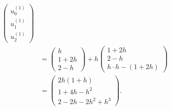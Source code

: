 \documentclass[12pt]{article}
\begin{document}
\begin{enumerate}[i)]
\begin{align}
{\begin{aligned}
\begin{pmatrix}
					      u_0^{(1)} \\u_1^{(1)} \\u_2^{(1)}
				      \end{pmatrix}
				      \\
				                & =
				      \begin{pmatrix}
					      h \\1+2h\\2-h
				      \end{pmatrix}
				      +h\begin{pmatrix}
					      1+2h \\2-h\\h\cdot h-(1+2h)
				      \end{pmatrix}             \\
				                & 
				      =\begin{pmatrix}
					      2h(1+h) \\1+4h-h^2\\2-2h-2h^2+h^3
				      \end{pmatrix}.
			      \end{aligned}
		      }
	      \end{align}
\end{enumerate}
\end{document}
